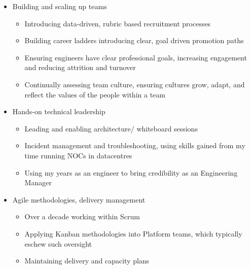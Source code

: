 \documentclass[11pt,a4paper,sans]{article}
\begin{document}
\begin{itemize}
\item Building and scaling up teams
  \begin{itemize}
  \item Introducing data-driven, rubric based recruitment processes
  \item Building career ladders introducing clear, goal driven promotion paths
  \item Ensuring engineers have clear professional goals, increasing engagement and reducing attrition and turnover
  \item Continually assessing team culture, ensuring cultures grow, adapt, and reflect the values of the people within a team
  \end{itemize}
\item Hands-on technical leadership
  \begin{itemize}
  \item Leading and enabling architecture/ whiteboard sessions
  \item Incident management and troubleshooting, using skills gained from my time running NOCs in datacentres
  \item Using my years as an engineer to bring credibility as an Engineering Manager
  \end{itemize}
\item Agile methodologies, delivery management
  \begin{itemize}
  \item Over a decade working within Scrum
  \item Applying Kanban methodologies into Platform teams, which typically eschew such oversight
  \item Maintaining delivery and capacity plans
  \end{itemize}
\end{itemize}





\end{document}
